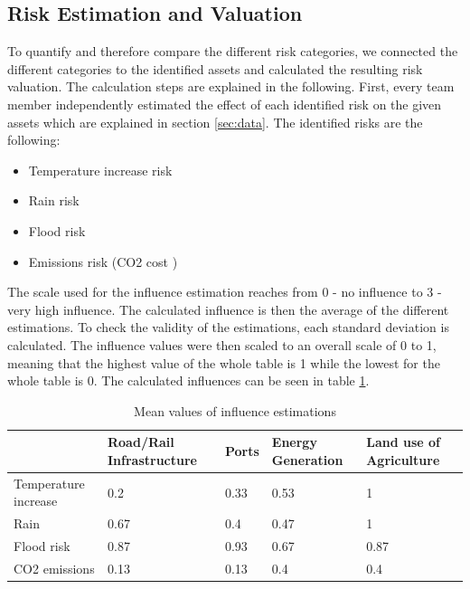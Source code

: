 \documentclass[10pt,a4paper]{article}
\begin{document}
\begin{itemize}
\end{itemize}

\subsection{Risk Estimation and Valuation}

    To quantify and therefore compare the different risk categories, we connected the different categories to the identified assets and calculated the resulting risk valuation. The calculation steps are explained in the following.
    First, every team member independently estimated the effect of each identified risk on the given assets which are explained in section \ref{sec:data}. The identified risks are the following:
    \begin{itemize}  
        \item Temperature increase risk
        \item Rain risk
        \item Flood risk
        \item Emissions risk (CO2 cost \cite{2022uk})
    \end{itemize}
    The scale used for the influence estimation reaches from 0 - no influence to 3 - very high influence. The calculated influence is then the average of the different estimations. To check the validity of the estimations, each standard deviation is calculated. The influence values were then scaled to an overall scale of 0 to 1, meaning that the highest value of the whole table is 1 while the lowest for the whole table is 0. The calculated influences can be seen in table \ref{est mean}.
    \begin{table}[H]
    \centering
    \begin{tabular}{|l|l|l|l|l|}
    \hline
                         & Road/Rail Infrastructure & Ports & Energy Generation & Land use of Agriculture \\ \hline
    Temperature increase & 0.2                      & 0.33  & 0.53              & 1                       \\ \hline
    Rain                 & 0.67                     & 0.4   & 0.47              & 1                       \\ \hline
    Flood risk           & 0.87                     & 0.93  & 0.67              & 0.87                    \\ \hline
    CO2 emissions        & 0.13                     & 0.13  & 0.4               & 0.4                    
    \\ \hline
    \end{tabular}
    \caption{Mean values of influence estimations}
    \label{est mean}
    \end{table}
\end{document}
